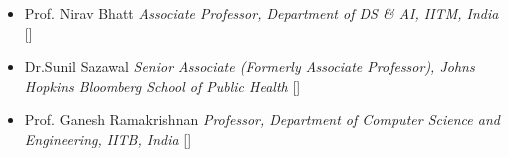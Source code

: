 
\begin{referees}
\course
	{\begin{itemize}
	
	\item {Prof. Nirav Bhatt} \dotfill \emph{Associate Professor, Department of DS \& AI, IITM, India}  [\href{https://www.iitmz.ac.in/schools/engineering-and-science/faculty/dr-nirav-bhatt}{\small{\websiteSymbol}}]
	
	\item {Dr.Sunil Sazawal} \dotfill \emph{Senior Associate (Formerly Associate Professor), Johns Hopkins Bloomberg School of Public Health} [\href{https://publichealth.jhu.edu/faculty/569/sunil-sazawal}{\small{\websiteSymbol}}]
	
	\item {Prof. Ganesh Ramakrishnan} \dotfill \emph{Professor, Department of Computer Science and Engineering, IITB, India} [\href{https://www.cse.iitb.ac.in/~ganesh/}{\small{\websiteSymbol}}]
	

    
     \end{itemize}}
     
\end{referees}